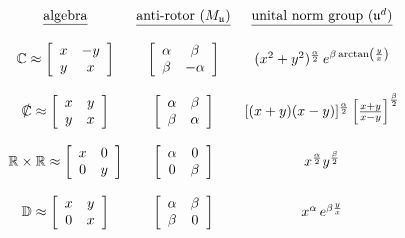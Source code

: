 \documentclass{amsart}
\numberwithin{equation}{section}
\theoremstyle{definition}
\numberwithin{theorem}{section}
\begin{document}
\hspace{.7cm}$ \begin{array}{cccccccc} 
\mbox{\underline{algebra}} & \mbox{\underline{anti-rotor $(M_{\mathfrak{u}})$}} & \mbox{\underline{unital norm group ($\mathfrak{u}^d$)}}  \\ 
\\
\mathbb{C} \approx \left[\begin{array}{ccc}
x  & -y    \\
 y & x \\   
\end{array}\right]   & \left[\begin{array}{ccc}
\alpha  & \beta    \\
 \beta & -\alpha \\   
\end{array}\right]  & (x^2+y^2)^{\frac{\alpha}{2}} \,e^{\beta\,{\rm arctan}\left(\frac{y}{x}\right)}  \\ \\
\slashed{\mathbb{C}} \approx \left[\begin{array}{ccc}
x  & y    \\
 y & x \\   
\end{array}\right]   & \left[\begin{array}{ccc}
\alpha  & \beta    \\
 \beta & \alpha \\   
\end{array}\right]  & [(x+y)(x-y)]^{\frac{\alpha}{2}} \left[\frac{x+y}{x-y}\right]^{\frac{\beta}{2}}  \\ \\ 
\mathbb{R}\times\mathbb{R} \approx \left[\begin{array}{ccc}
x  & 0    \\
 0 & y \\   
\end{array}\right]   & \left[\begin{array}{ccc}
\alpha  & 0    \\
 0 & \beta \\   
\end{array}\right]  & x^\frac{\alpha}{2} y^\frac{\beta}{2}  \\ \\
\mathbb{D} \approx \left[\begin{array}{ccc}
x  & y    \\
 0 & x \\   
\end{array}\right]   & \left[\begin{array}{ccc}
\alpha  & \beta    \\
 \beta & 0 \\   
\end{array}\right]  & x^\alpha\,e^{\beta \frac{y}{x}}  \\ \\
\end{array} $
\end{document}
